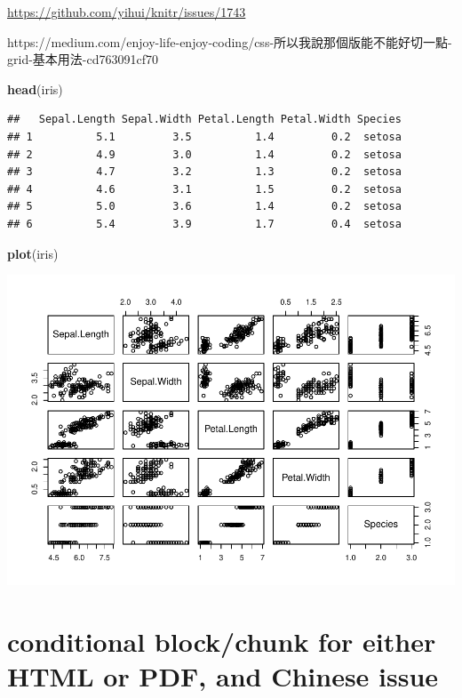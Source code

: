\documentclass[
]{book}
\newenvironment{Shaded}{\begin{snugshade}}{\end{snugshade}}
\newcommand{\FunctionTok}[1]{\textcolor[rgb]{0.13,0.29,0.53}{\textbf{#1}}}
\newcommand{\NormalTok}[1]{#1}
\theoremstyle{definition}
\theoremstyle{definition}
\theoremstyle{definition}
\theoremstyle{definition}
\theoremstyle{remark}
\begin{document}
\url{https://github.com/yihui/knitr/issues/1743}

\begin{CJK}{UTF8}{bsmi}
https://medium.com/enjoy-life-enjoy-coding/css-所以我說那個版能不能好切一點-grid-基本用法-cd763091cf70
\end{CJK}

\begin{Shaded}
\begin{Highlighting}[]
\FunctionTok{head}\NormalTok{(iris)}
\end{Highlighting}
\end{Shaded}

\begin{verbatim}
##   Sepal.Length Sepal.Width Petal.Length Petal.Width Species
## 1          5.1         3.5          1.4         0.2  setosa
## 2          4.9         3.0          1.4         0.2  setosa
## 3          4.7         3.2          1.3         0.2  setosa
## 4          4.6         3.1          1.5         0.2  setosa
## 5          5.0         3.6          1.4         0.2  setosa
## 6          5.4         3.9          1.7         0.4  setosa
\end{verbatim}

\begin{Shaded}
\begin{Highlighting}[]
\FunctionTok{plot}\NormalTok{(iris)}
\end{Highlighting}
\end{Shaded}

\includegraphics{202401280001-test_files/figure-latex/unnamed-chunk-34-1.pdf}

\hypertarget{conditional-blockchunk-for-either-html-or-pdf-and-chinese-issue}{%
\section{conditional block/chunk for either HTML or PDF, and Chinese issue}\label{conditional-blockchunk-for-either-html-or-pdf-and-chinese-issue}}
\end{document}
